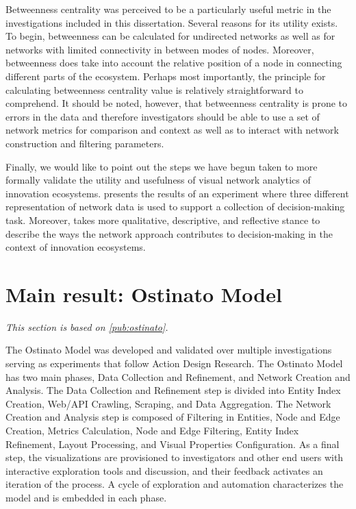 Betweenness centrality was perceived to be a particularly useful metric in the investigations included in this dissertation. Several reasons for its utility exists. To begin, betweenness can be calculated for undirected networks as well as for networks with limited connectivity in between modes of nodes. Moreover, betweenness does take into account the relative position of a node in connecting different parts of the ecosystem. Perhaps most importantly, the principle for calculating betweenness centrality value is relatively straightforward to comprehend. It should be noted, however, that betweenness centrality is prone to errors in the data and therefore investigators should be able to use a set of network metrics for comparison and context as well as to interact with network construction and filtering parameters.

Finally, we would like to point out the steps we have begun taken to more formally validate the utility and usefulness of visual network analytics of innovation ecosystems. \cite{Basole2016EnablingAnalysis} presents the results of an experiment where three different representation of network data is used to support a collection of decision-making task. Moreover, \cite{Russell2015IFKAD} takes more qualitative, descriptive, and reflective stance to describe the ways the network approach contributes to decision-making in the context of innovation ecosystems. 

\section{Main result: Ostinato Model}

\textit{This section is based on \ref{pub:ostinato}.}

The Ostinato Model was developed and validated over multiple investigations serving as experiments that follow Action Design Research. The Ostinato Model has two main phases, Data Collection and Refinement, and Network Creation and Analysis. The Data Collection and Refinement step is divided into Entity Index Creation, Web/API Crawling, Scraping, and Data Aggregation. The Network Creation and Analysis step is composed of Filtering in Entities, Node and Edge Creation, Metrics Calculation, Node and Edge Filtering, Entity Index Refinement, Layout Processing, and Visual Properties Configuration. As a final step, the visualizations are provisioned to investigators and other end users with interactive exploration tools and discussion, and their feedback activates an iteration of the process. A cycle of exploration and automation characterizes the model and is embedded in each phase.

